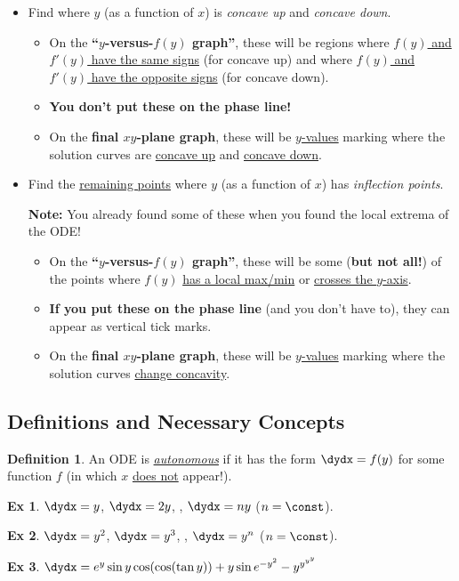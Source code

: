 \documentclass[12pt]{article}
\theoremstyle{definition}
\newtheorem{defn}{Definition}
\theoremstyle{underl}
\newtheorem*{ex}{Ex}
\begin{document}
\begin{itemize}
\begin{itemize}
			\end{itemize}
		\item Find where $y$ (as a function of $x$) is \textit{concave up} and \textit{concave down}.
		\begin{itemize}
			\item On the \textbf{``$y$-versus-$f(y)$ graph''}, these will be regions where \ul{$f(y)$ and $f'(y)$ have the same signs} (for concave up) and where \ul{$f(y)$ and $f'(y)$ have the opposite signs} (for concave down).
			\item \textbf{You don't put these on the phase line!}
			\item On the \textbf{final $xy$-plane graph}, these will be \ul{$y$-values} marking where the solution curves are \ul{concave up} and \ul{concave down}.
		\end{itemize}
		\item Find the \ul{remaining points} where $y$ (as a function of $x$) has \textit{inflection points}. 
		
		\textbf{Note:} You already found some of these when you found the local extrema of the ODE!
		\begin{itemize}
			\item On the \textbf{``$y$-versus-$f(y)$ graph''}, these will be some (\textbf{but not all!}) of the points where $f(y)$ \ul{has a local max/min} or \ul{crosses the $y$-axis}.
			\item \textbf{If you put these on the phase line} (and you don't have to), they can appear as vertical tick marks.
			\item On the \textbf{final $xy$-plane graph}, these will be \ul{$y$-values} marking where the solution curves \ul{change concavity}.
		\end{itemize}
	\end{itemize}


	\subsection*{Definitions and Necessary Concepts}
	\begin{defn}
		An ODE is \ul{\textit{autonomous}} if it has the form $\dydx=f(y)$ for some function $f$ (in which $x$ \ul{does not} appear!).
		\begin{adjustwidth}{0.375in}{0.375in}
			\vspace{-6mm}
			\begin{ex}
				$\dydx=y$, $\dydx=2y$, \textellipsis, $\dydx=ny$ ($n=\const$).
			\end{ex}
			\begin{ex}
				$\dydx=y^2$, $\dydx=y^3$, \textellipsis, $\dydx=y^n$ ($n=\const$).
			\end{ex}
			\begin{ex}
				$\dydx=e^y\sin{y}\cos(\cos(\tan{y}))+y\sin{e^{-y^2}}-y^{y^{y^y}}$
			\end{ex}
		\end{adjustwidth}
	\end{defn}
\end{document}
